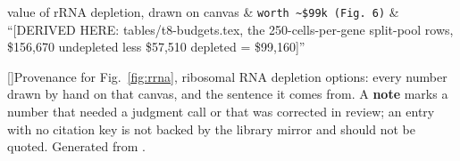 \begin{longtable}
\addlinespace[2.5pt]
value of rRNA depletion, drawn on canvas & \texttt{worth \textasciitilde{}\$99k (Fig. 6)} & ``[DERIVED HERE: tables/t8-budgets.tex, the 250-cells-per-gene split-pool rows, \$156,670 undepleted less \$57,510 depleted = \$99,160]''  \\
\addlinespace[2.5pt]
\end{longtable}
\endgroup
\vspace{0.6em}
\begingroup\scriptsize
\setlength{\LTleft}{0pt}\setlength{\LTright}{0pt}
\begingroup\captionsetup{type=table}
[]{Provenance for Fig.~\ref{fig:rrna}, ribosomal RNA depletion options: every number drawn by hand on that canvas, and the sentence it comes from. A \textbf{note} marks a number that needed a judgment call or that was corrected in review; an entry with no citation key is not backed by the library mirror and should not be quoted. Generated from .}\label{tab:prov-rrna-depletion-options}
\endgroup
